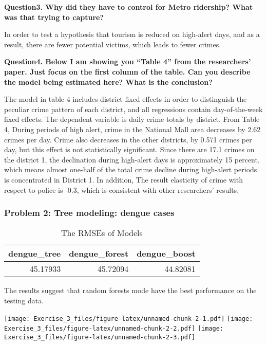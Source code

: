 \documentclass[
]{article}
\begin{document}
\textbf{Question3. Why did they have to control for Metro ridership?
What was that trying to capture?}

In order to test a hypothesis that tourism is reduced on high-alert
days, and as a result, there are fewer potential victims, which leads to
fewer crimes.

\textbf{Question4. Below I am showing you ``Table 4'' from the
researchers' paper. Just focus on the first column of the table. Can you
describe the model being estimated here? What is the conclusion?}

The model in table 4 includes district fixed effects in order to
distinguish the peculiar crime pattern of each district, and all
regressions contain day-of-the-week fixed effects. The dependent
variable is daily crime totals by district. From Table 4, During periods
of high alert, crime in the National Mall area decreases by 2.62 crimes
per day. Crime also decreases in the other districts, by 0.571 crimes
per day, but this effect is not statistically significant. Since there
are 17.1 crimes on the district 1, the declination during high-alert
days is approximately 15 percent, which means almost one-half of the
total crime decline during high-alert periods is concentrated in
District 1. In addition, The result elasticity of crime with respect to
police is -0.3, which is consistent with other researchers' results.

\hypertarget{problem-2-tree-modeling-dengue-cases}{%
\subsubsection{Problem 2: Tree modeling: dengue
cases}\label{problem-2-tree-modeling-dengue-cases}}

\begin{table}

\caption{\label{tab:unnamed-chunk-1}The RMSEs of Models}
\centering
\begin{tabular}[t]{r|r|r}
\hline
dengue\_tree & dengue\_forest & dengue\_boost\\
\hline
45.17933 & 45.72094 & 44.82081\\
\hline
\end{tabular}
\end{table}

The results suggest that random forests mode have the best performance
on the testing data.

\texttt{[image: Exercise\_3\_files/figure-latex/unnamed-chunk-2-1.pdf]}
\texttt{[image: Exercise\_3\_files/figure-latex/unnamed-chunk-2-2.pdf]}
\texttt{[image: Exercise\_3\_files/figure-latex/unnamed-chunk-2-3.pdf]}
\end{document}
